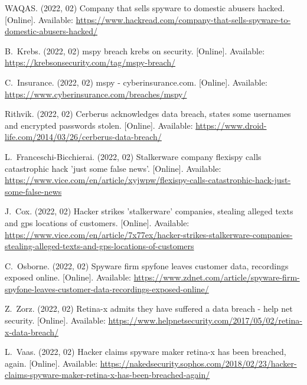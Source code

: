 \documentclass[sigconf,balance=false]{acmart}
\begin{document}
\begin{thebibliography}{100}
\BIBentryALTinterwordspacing
WAQAS. (2022, 02) Company that sells spyware to domestic abusers hacked.
  [Online]. Available:
  \url{https://www.hackread.com/company-that-sells-spyware-to-domestic-abusers-hacked/}
\BIBentrySTDinterwordspacing

\BIBentryALTinterwordspacing
B.~Krebs. (2022, 02) mspy breach \- krebs on security. [Online]. Available:
  \url{https://krebsonsecurity.com/tag/mspy-breach/}
\BIBentrySTDinterwordspacing

\BIBentryALTinterwordspacing
C.~Insurance. (2022, 02) mspy - cyberinsurance.com. [Online]. Available:
  \url{https://www.cyberinsurance.com/breaches/mspy/}
\BIBentrySTDinterwordspacing

\BIBentryALTinterwordspacing
Rithvik. (2022, 02) Cerberus acknowledges data breach, states some usernames
  and encrypted passwords stolen. [Online]. Available:
  \url{https://www.droid-life.com/2014/03/26/cerberus-data-breach/}
\BIBentrySTDinterwordspacing

\BIBentryALTinterwordspacing
L.~Franceschi-Bicchierai. (2022, 02) Stalkerware company flexispy calls
  catastrophic hack 'just some false news'. [Online]. Available:
  \url{https://www.vice.com/en/article/xyjwpw/flexispy-calls-catastrophic-hack-just-some-false-news}
\BIBentrySTDinterwordspacing

\BIBentryALTinterwordspacing
J.~Cox. (2022, 02) Hacker strikes 'stalkerware' companies, stealing alleged
  texts and gps locations of customers. [Online]. Available:
  \url{https://www.vice.com/en/article/7x77ex/hacker-strikes-stalkerware-companies-stealing-alleged-texts-and-gps-locations-of-customers}
\BIBentrySTDinterwordspacing

\BIBentryALTinterwordspacing
C.~Osborne. (2022, 02) Spyware firm spyfone leaves customer data, recordings
  exposed online. [Online]. Available:
  \url{https://www.zdnet.com/article/spyware-firm-spyfone-leaves-customer-data-recordings-exposed-online/}
\BIBentrySTDinterwordspacing

\BIBentryALTinterwordspacing
Z.~Zorz. (2022, 02) Retina-x admits they have suffered a data breach - help net
  security. [Online]. Available:
  \url{https://www.helpnetsecurity.com/2017/05/02/retina-x-data-breach/}
\BIBentrySTDinterwordspacing

\BIBentryALTinterwordspacing
L.~Vaas. (2022, 02) Hacker claims spyware maker retina-x has been breached,
  again. [Online]. Available:
  \url{https://nakedsecurity.sophos.com/2018/02/23/hacker-claims-spyware-maker-retina-x-has-been-breached-again/}
\BIBentrySTDinterwordspacing


\end{thebibliography}
\end{document}
